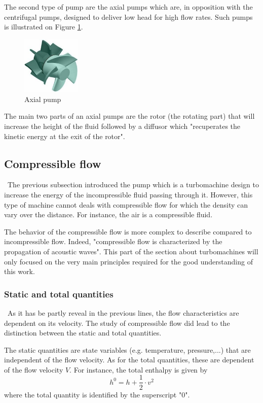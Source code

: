 The second type of pump are the axial pumps which are, in opposition with the centrifugal pumps, designed to deliver low head for high flow rates. Such pumps is illustrated on Figure \ref{fig:C3_axial_pump}. 
\begin{figure}[h!]
\centering
\includegraphics[width=0.25\textwidth]{axial_pump.png}
\caption{Axial pump \citep{Hillewaert2019}}
\label{fig:C3_axial_pump}
\end{figure}

The main two parts of an axial pumps are the rotor (the rotating part) that will increase the height of the fluid followed by a diffusor which "recuperates the kinetic energy at the exit of the rotor"\citep{Hillewaert2019}.
\subsection{Compressible flow}
\quad\, The previous subsection introduced the pump which is a turbomachine design to increase the energy of the incompressible fluid passing through it. However, this type of machine cannot deals with compressible flow for which the density can vary over the distance. For instance, the air is a compressible fluid. 

The behavior of the compressible flow is more complex to describe compared to incompressible flow. Indeed, "compressible flow is characterized by the propagation of acoustic waves"\citep{Hillewaert2019}.   This part of the section about turbomachines will only focused on the very main principles required for the good understanding of this work.

\subsubsection{Static and total quantities}
\quad\, As it has be partly reveal in the previous lines, the flow characteristics are dependent on its velocity. The study of compressible flow did lead to the distinction between the static and total quantities. 

The static quantities are state variables (e.g. temperature, pressure,...) that are independent of the flow velocity. As for the total quantities, these are dependent of the flow velocity $V$. For instance, the total enthalpy is given by
\begin{equation}
h^0 = h + \frac{1}{2}\cdot v^2\label{eq:C3_h0}
\end{equation}
where the total quantity is identified by the superscript "0".

